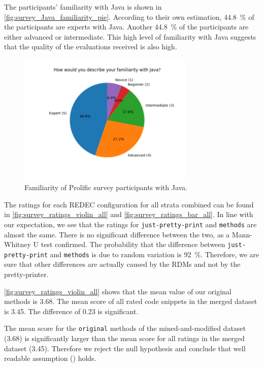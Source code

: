 \documentclass[%
class=scrreprt,
chapterprefix=false,%
open=right,%
twoside=false,%
paper=a4,%
logofile={Logo\_zentral\_farbig\_EN.png},%
thesistype=master,%
UKenglish,%
]{se2thesis}
\theoremstyle{definition}
\newcommand{\rdh}{REDEC\xspace}
\newcommand{\rdhs}{RDMs\xspace}
\newcommand{\none}{just-pretty-print\xspace} %
\newcommand{\nonet}{\texttt{\none}\xspace} %
\newenvironment{researchbox}[1]{\begin{tcolorbox}[colback=blue!10!white,colframe=blue!50!black,title=#1]}{\end{tcolorbox}}
\begin{document}
	The participants' familiarity with Java is shown in \autoref{fig:survey_Java_familiarity_pie}. According to their own estimation, 44.8~\% of the participants are experts with Java. Another 44.8~\% of the participants are either advanced or intermediate. This high level of familiarity with Java suggests that the quality of the evaluations received is also high.
	
	\begin{figure}[tb]
		\centering
		\includegraphics[width=0.75\textwidth]{img/survey_Java_familiarity_pie.png}
		\caption{Familiarity of Prolific survey participants with Java.}
		\label{fig:survey_Java_familiarity_pie}
	\end{figure}
	
	The ratings for each \rdh configuration for all strata combined can be found in \autoref{fig:survey_ratings_violin_all} and \autoref{fig:survey_ratings_bar_all}. 	
	In line with our expectation, we see that the ratings for \nonet and \texttt{methods} are almost the same. There is no significant difference between the two, as a Mann-Whitney U test confirmed. The probability that the difference between \nonet and \texttt{methods} is due to random variation is 92~\%. 
	Therefore, we are sure that other differences are actually caused by the \rdhs and not by the pretty-printer.

	\autoref{fig:survey_ratings_violin_all} shows that the mean value of our original methods is 3.68. The mean score of all rated code snippets in the merged dataset is 3.45. The difference of 0.23 is significant.
	

	\begin{researchbox}{Summary (RQ1 - mined-well):}
		The mean score for the \texttt{original} methods of the mined-and-modified dataset (3.68) is significantly larger than the mean score for all ratings in the merged dataset (3.45). Therefore we reject the null hypothesis and conclude that well readable assumption () holds.
	\end{researchbox}
	
\end{document}
